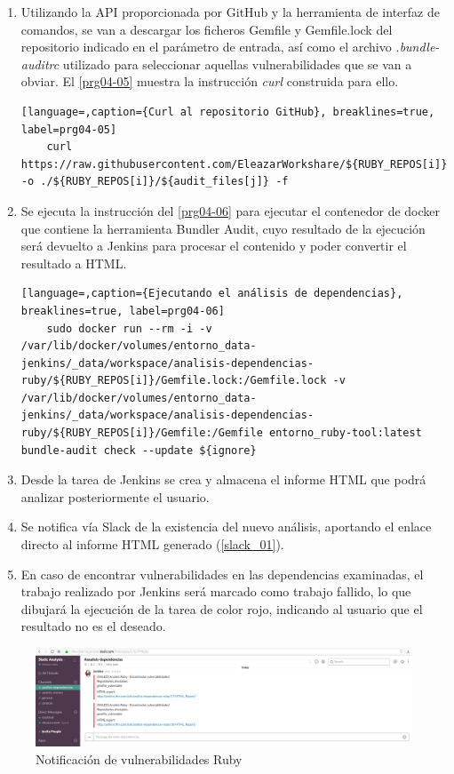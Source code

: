 \begin{enumerate}
	\item Utilizando la API proporcionada por GitHub y la herramienta de interfaz de comandos, se van a descargar los ficheros Gemfile y Gemfile.lock del repositorio indicado en el parámetro de entrada, así como el archivo \textit{.bundle-auditrc} utilizado para seleccionar aquellas vulnerabilidades que se van a obviar. El \autoref{prg04-05} muestra la instrucción \textit{curl} construida para ello. 
	\begin{lstlisting}[language=,caption={Curl al repositorio GitHub}, breaklines=true, label=prg04-05]
	curl https://raw.githubusercontent.com/EleazarWorkshare/${RUBY_REPOS[i]}/master/${audit_files[j]} -o ./${RUBY_REPOS[i]}/${audit_files[j]} -f
	\end{lstlisting}
	\item Se ejecuta la instrucción del \autoref{prg04-06} para ejecutar el contenedor de docker que contiene la herramienta Bundler Audit, cuyo resultado de la ejecución será devuelto a Jenkins para procesar el contenido y poder convertir el resultado a HTML.
	
	\begin{lstlisting}[language=,caption={Ejecutando el análisis de dependencias}, breaklines=true, label=prg04-06]
	sudo docker run --rm -i -v /var/lib/docker/volumes/entorno_data-jenkins/_data/workspace/analisis-dependencias-ruby/${RUBY_REPOS[i]}/Gemfile.lock:/Gemfile.lock -v /var/lib/docker/volumes/entorno_data-jenkins/_data/workspace/analisis-dependencias-ruby/${RUBY_REPOS[i]}/Gemfile:/Gemfile entorno_ruby-tool:latest bundle-audit check --update ${ignore}
	\end{lstlisting}
	\item Desde la tarea de Jenkins se crea y almacena el informe HTML que podrá analizar posteriormente el usuario.
	\item Se notifica vía Slack de la existencia del nuevo análisis, aportando el enlace directo al informe HTML generado (\autoref{slack_01}).
	\item En caso de encontrar vulnerabilidades en las dependencias examinadas, el trabajo realizado por Jenkins será marcado como trabajo fallido, lo que dibujará la ejecución de la tarea de color rojo, indicando al usuario que el resultado no es el deseado. 
\end{enumerate}

\begin{figure}[htbp]
	\centering
	\includegraphics[width=1.0\linewidth]
	{desarrollo/figuras/slack_01.png}
	\caption{Notificación de vulnerabilidades Ruby}
	\label{slack_01}
\end{figure}

